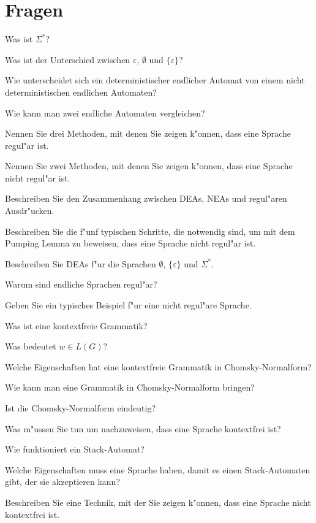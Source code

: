 \documentclass[a4paper,12pt,twocolumn]{article}
\begin{document}
\section{Fragen}
\begin{compactenum}
\item Was ist $\Sigma^*$?
\item Was ist der Unterschied zwischen $\varepsilon$, $\emptyset$ und
$\{\varepsilon\}$?
\item Wie unterscheidet sich ein deterministischer endlicher Automat
von einem nicht deterministischen endlichen Automaten?
\item Wie kann man zwei endliche Automaten vergleichen?
\item Nennen Sie drei Methoden, mit denen Sie zeigen k"onnen, dass eine Sprache
regul"ar ist.
\item Nennen Sie zwei Methoden, mit denen Sie zeigen k"onnen, dass eine Sprache
nicht regul"ar ist.
\item Beschreiben Sie den Zusammenhang zwischen DEAs, NEAs und regul"aren
Ausdr"ucken.
\item Beschreiben Sie die f"unf typischen Schritte, die notwendig sind,
um mit dem Pumping Lemma zu beweisen, dass eine Sprache nicht regul"ar ist.
\item Beschreiben Sie DEAs f"ur die Sprachen $\emptyset$, $\{\varepsilon\}$
und $\Sigma^*$.
\item Warum sind endliche Sprachen regul"ar?
\item Geben Sie ein typisches Beispiel f"ur eine nicht regul"are Sprache.
\item Was ist eine kontextfreie Grammatik?
\item Was bedeutet $w\in L(G)$?
\item Welche Eigenschaften hat eine kontextfreie Grammatik in
Chomsky-Normalform?
\item Wie kann man eine Grammatik in Chomsky-Normalform bringen?
\item Ist die Chomsky-Normalform eindeutig?
\item Was m"ussen Sie tun um nachzuweisen, dass eine Sprache kontextfrei ist?
\item Wie funktioniert ein Stack-Automat?
\item Welche Eigenschaften muss eine Sprache haben, damit es einen
Stack-Automaten gibt, der sie akzeptieren kann?
\item Beschreiben Sie eine Technik, mit der Sie zeigen k"onnen, dass eine
Sprache nicht kontextfrei ist.

\end{compactenum}
\end{document}
